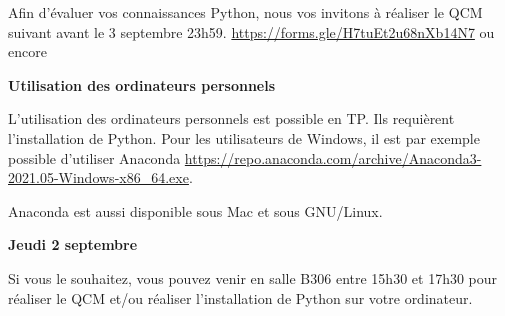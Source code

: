 


Afin d'évaluer vos connaissances Python, nous vos invitons à réaliser le QCM suivant avant le 3 septembre 23h59.
\url{https://forms.gle/H7tuEt2u68nXb14N7} ou encore 


\begin{center}


\end{center}

\vspace{.5cm}


\textbf{Utilisation des ordinateurs personnels}

L'utilisation des ordinateurs personnels est possible en TP. Ils requièrent l'installation de Python. Pour les utilisateurs de Windows, il est par exemple possible d'utiliser Anaconda \url{https://repo.anaconda.com/archive/Anaconda3-2021.05-Windows-x86_64.exe}. 

\begin{center}
\end{center}

Anaconda est aussi disponible sous Mac et sous GNU/Linux.

\vspace{.5cm}

\textbf{Jeudi 2 septembre}

Si vous le souhaitez, vous pouvez venir en salle B306 entre 15h30 et 17h30 pour réaliser le QCM et/ou réaliser l'installation de Python sur votre ordinateur.

